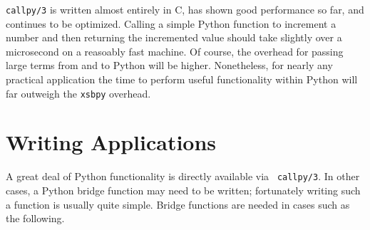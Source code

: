 {\tt callpy/3} is written almost entirely in C, has shown good
performance so far, and continues to be optimized.  Calling a simple
Python function to increment a number and then returning the
incremented value should take slightly over a microsecond on a
reasoably fast machine.  Of course, the overhead for passing large
terms from and to Python will be higher.  Nonetheless, for nearly any
practical application the time to perform useful functionality within
Python will far outweigh the {\tt xsbpy} overhead.

\section{Writing Applications}

A great deal of Python functionality is directly available via {\tt
  callpy/3}.  In other cases, a Python bridge function may need to be
written; fortunately writing such a function is usually quite
simple.  Bridge functions are needed in cases such as the following.

